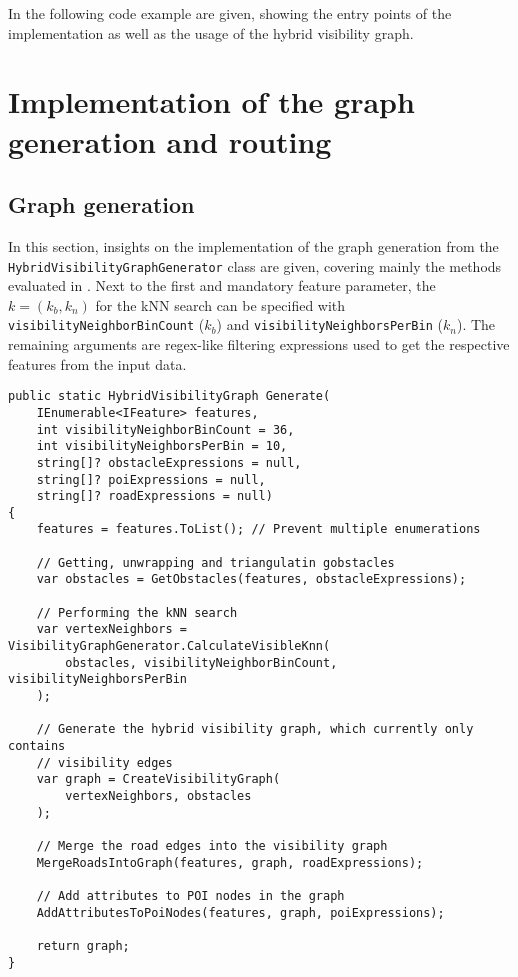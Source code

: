 
In the following code example are given, showing the entry points of the implementation as well as the usage of the hybrid visibility graph.

\section*{Implementation of the graph generation and routing}

	\subsection*{Graph generation}
		
		In this section, insights on the implementation of the graph generation from the \texttt{HybridVisibilityGraphGenerator} class are given, covering mainly the methods evaluated in .
		Next to the first and mandatory feature parameter, the $k=(k_b, k_n)$ for the kNN search can be specified with \texttt{visibilityNeighborBinCount} ($k_b$) and \texttt{visibilityNeighborsPerBin} ($k_n$).
		The remaining arguments are regex-like filtering expressions used to get the respective features from the input data.
		
		\begin{verbatim}
public static HybridVisibilityGraph Generate(
	IEnumerable<IFeature> features,
	int visibilityNeighborBinCount = 36,
	int visibilityNeighborsPerBin = 10,
	string[]? obstacleExpressions = null,
	string[]? poiExpressions = null,
	string[]? roadExpressions = null)
{
	features = features.ToList(); // Prevent multiple enumerations
	
	// Getting, unwrapping and triangulatin gobstacles
	var obstacles = GetObstacles(features, obstacleExpressions);
	
	// Performing the kNN search
	var vertexNeighbors = VisibilityGraphGenerator.CalculateVisibleKnn(
		obstacles, visibilityNeighborBinCount, visibilityNeighborsPerBin
	);
	
	// Generate the hybrid visibility graph, which currently only contains
	// visibility edges
	var graph = CreateVisibilityGraph(
		vertexNeighbors, obstacles
	);
	
	// Merge the road edges into the visibility graph
	MergeRoadsIntoGraph(features, graph, roadExpressions);
	
	// Add attributes to POI nodes in the graph
	AddAttributesToPoiNodes(features, graph, poiExpressions);
	
	return graph;
}
		\end{verbatim}
		
